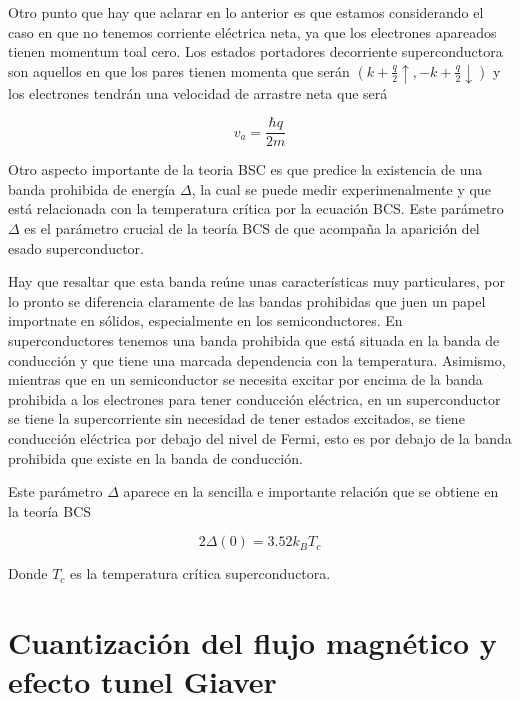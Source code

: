 Otro punto que hay que aclarar en lo anterior es que estamos considerando el caso en que no tenemos corriente eléctrica neta, ya que los electrones apareados tienen momentum toal cero. Los estados portadores  decorriente superconductora son aquellos en que los pares tienen momenta que serán $(k + \frac{q}{2} \uparrow, -k + \frac{q}{2} \downarrow)$ y los electrones tendrán una velocidad de arrastre neta que será

\begin{equation}
    v_a = \frac{\hbar q}{2m}
\end{equation}

Otro aspecto importante de la teoria BSC es que predice la existencia de una banda prohibida de energía $\Delta$, la cual se puede medir experimenalmente y que está relacionada con la temperatura crítica por la ecuación BCS. Este parámetro $\Delta$ es el parámetro crucial de la teoría BCS de que acompaña la aparición del esado superconductor.

Hay que resaltar que esta banda reúne unas características muy particulares, por lo pronto se diferencia claramente de las bandas prohibidas que juen un papel importnate en sólidos, especialmente en los semiconductores. En superconductores tenemos una banda prohibida que está situada en la banda de conducción y que tiene una marcada dependencia con la temperatura. Asimismo, mientras que en un semiconductor se necesita excitar por encima de la banda prohibida a los electrones para tener conducción eléctrica, en un superconductor se tiene la supercorriente sin necesidad de tener estados excitados, se tiene conducción eléctrica por debajo del nivel de Fermi, esto es por debajo de la banda prohibida que existe en la banda de conducción.

Este parámetro $\Delta$ aparece en la sencilla e importante relación que se obtiene en la teoría BCS

\begin{equation}
    2 \Delta(0) = 3.52 k_B T_c
\end{equation}

Donde $T_c$ es la temperatura crítica superconductora.

\section{Cuantización del flujo magnético y efecto tunel Giaver}

